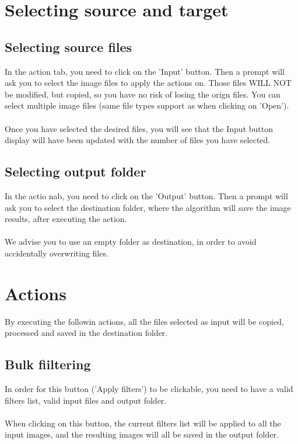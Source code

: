 \documentclass[12pt,a4paper]{article}
\begin{document}
\section{Selecting source and target}

\subsection{Selecting source files}

In the action tab, you need to click on the 'Input' button. Then a prompt will ask you to select the image files to apply the actions on. Those files WILL NOT be modified, but copied, so you have no risk of losing the orign files.
You can select multiple image files (same file types support as when clicking on 'Open').\\
~\\
Once you have selected the desired files, you will see that the Input button display will have been updated with the number of files you have selected.

\subsection{Selecting output folder}

In the actio nab, you need to click on the 'Output' button. Then a prompt will ask you to select the destination folder, where the algorithm will save the image results, after executing the action.\\
~\\
We advise you to use an empty folder as destination, in order to avoid accidentally overwriting files.

\section{Actions}

By executing the followin actions, all the files selected as input will be copied, processed and saved in the destination folder.

\subsection{Bulk fiiltering}

In order for this button ('Apply filters') to be clickable, you need to have a valid filters list, valid input files and output folder.\\
~\\
When clicking on this button, the current filters list will be applied to all the input images, and the resulting images will all be saved in the output folder.
\end{document}
